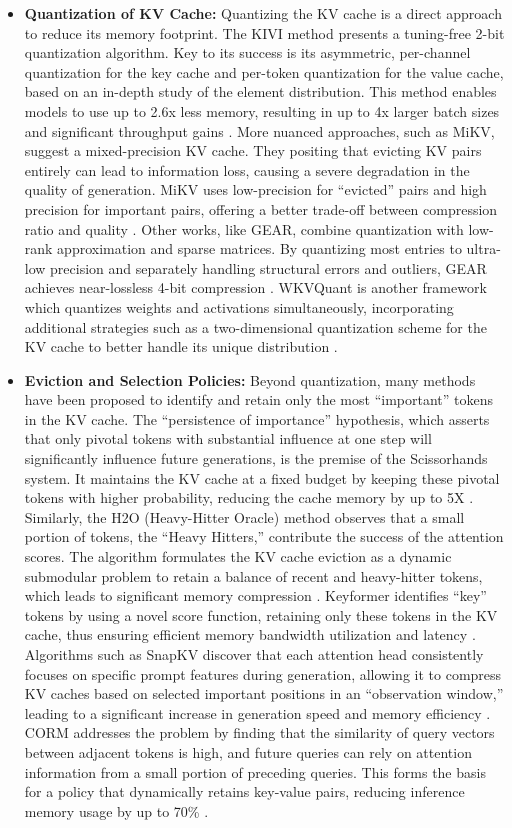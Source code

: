 \documentclass[11pt]{article}
\begin{document}
\begin{itemize}
\item
  \textbf{Quantization of KV Cache:} Quantizing the KV cache is a direct approach to reduce its memory footprint. The KIVI method presents a tuning-free 2-bit quantization algorithm. Key to its success is its asymmetric, per-channel quantization for the key cache and per-token quantization for the value cache, based on an in-depth study of the element distribution. This method enables models to use up to 2.6x less memory, resulting in up to 4x larger batch sizes and significant throughput gains \cite{ref298}. More nuanced approaches, such as MiKV, suggest a mixed-precision KV cache. They positing that evicting KV pairs entirely can lead to information loss, causing a severe degradation in the quality of generation. MiKV uses low-precision for ``evicted'' pairs and high precision for important pairs, offering a better trade-off between compression ratio and quality \cite{ref172}. Other works, like GEAR, combine quantization with low-rank approximation and sparse matrices. By quantizing most entries to ultra-low precision and separately handling structural errors and outliers, GEAR achieves near-lossless 4-bit compression \cite{ref171}. WKVQuant is another framework which quantizes weights and activations simultaneously, incorporating additional strategies such as a two-dimensional quantization scheme for the KV cache to better handle its unique distribution \cite{ref304}.
\item
  \textbf{Eviction and Selection Policies:} Beyond quantization, many methods have been proposed to identify and retain only the most ``important'' tokens in the KV cache. The ``persistence of importance'' hypothesis, which asserts that only pivotal tokens with substantial influence at one step will significantly influence future generations, is the premise of the Scissorhands system. It maintains the KV cache at a fixed budget by keeping these pivotal tokens with higher probability, reducing the cache memory by up to 5X \cite{ref305}. Similarly, the H2O (Heavy-Hitter Oracle) method observes that a small portion of tokens, the ``Heavy Hitters,'' contribute the success of the attention scores. The algorithm formulates the KV cache eviction as a dynamic submodular problem to retain a balance of recent and heavy-hitter tokens, which leads to significant memory compression \cite{ref306}. Keyformer identifies ``key'' tokens by using a novel score function, retaining only these tokens in the KV cache, thus ensuring efficient memory bandwidth utilization and latency \cite{ref307}. Algorithms such as SnapKV discover that each attention head consistently focuses on specific prompt features during generation, allowing it to compress KV caches based on selected important positions in an ``observation window,'' leading to a significant increase in generation speed and memory efficiency \cite{ref173}. CORM addresses the problem by finding that the similarity of query vectors between adjacent tokens is high, and future queries can rely on attention information from a small portion of preceding queries. This forms the basis for a policy that dynamically retains key-value pairs, reducing inference memory usage by up to 70\% \cite{ref308}.

\end{itemize}
\end{document}
